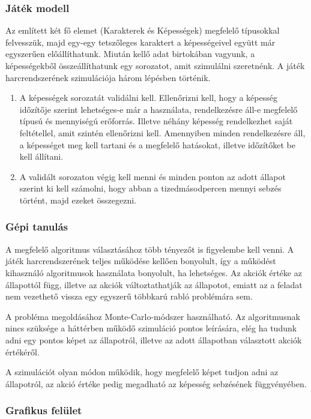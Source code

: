 \documentclass[12pt]{article}
\begin{document}
\subsubsection{Játék modell}

Az említett két fő elemet (Karakterek és Képességek) megfelelő típusokkal felvesszük, majd egy-egy tetszőleges karaktert a képességeivel együtt már egyszerűen előállíthatunk.
Miután kellő adat birtokában vagyunk, a képességekből összeállíthatunk egy sorozatot, amit szimulálni szeretnénk.
\newline
A játék harcrendszerének szimulációja három lépésben történik.
\begin{enumerate}
	\item A képességek sorozatát validálni kell. Ellenőrizni kell, hogy a képesség időzítője szerint lehetséges-e már a használata, rendelkezésre áll-e megfelelő típusú és mennyiségú erőforrás. Illetve néhány képesség rendelkezhet saját feltétellel, amit szintén ellenőrizni kell. Amennyiben minden rendelkezésre áll, a képességet meg kell tartani és a megfelelő hatásokat, illetve időzítőket be kell állítani.
	\item A validált sorozaton végig kell menni és minden ponton az adott állapot szerint ki kell számolni, hogy abban a tizedmásodpercen mennyi sebzés történt, majd ezeket összegezni.
\end{enumerate}

\subsubsection{Gépi tanulás}

A megfelelő algoritmus választásához több tényezőt is figyelembe kell venni. A játék harcrendszerének teljes működése kellően bonyolult, így a működést kihasználó algoritmusok használata bonyolult, ha lehetséges. 
Az akciók értéke az állapottól függ, illetve az akciók változtathatják az állapotot, emiatt az a feladat nem vezethető vissza egy egyszerű többkarú rabló problémára sem.

A probléma megoldásához Monte-Carlo-módszer használható. Az algoritmusnak nincs szüksége a háttérben működő szimuláció pontos leírására, elég ha tudunk adni egy pontos képet az állapotról, illetve az adott állapotban választott akciók értékéről.

A szimulációt olyan módon működik, hogy megfelelő képet tudjon adni az állapotról, az akció értéke pedig megadható az képesség sebzésének függvényében.

\subsubsection{Grafikus felület}
\end{document}
